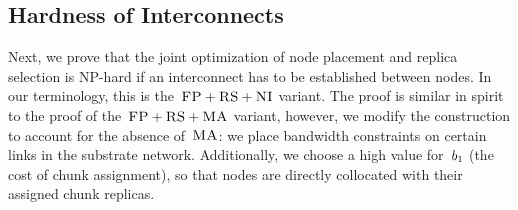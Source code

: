 \subsection{Hardness of Interconnects}\label{ssec:fprscc}



Next, we prove that the joint optimization of node placement and replica selection
is NP-hard if an interconnect has to be established between nodes.
In our terminology, this is the~$\textsc{FP}+\textsc{RS}+\textsc{NI}$ variant.
The proof is similar in spirit to the proof of the~$\textsc{FP}+\textsc{RS}+\textsc{MA}$ variant, however,
we modify the construction to account for the absence of~$\textsc{MA}$:
we place bandwidth constraints on certain links in the substrate network.
Additionally, we choose
a high value for~$b_1$ (the cost of chunk assignment), so that nodes are directly collocated with
their assigned chunk replicas.

